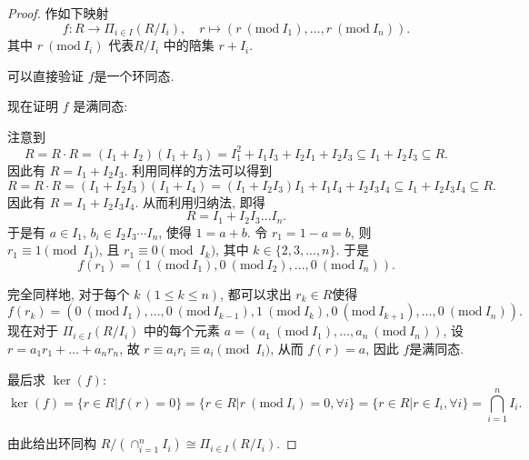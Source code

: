 \documentclass[a4paper,12pt]{ctexart}
\newtheorem{proof}{Proof}
\begin{document}
  \begin{proof} 
  作如下映射
  \[f:  R\rightarrow\Pi_{i\in I}(R/I_i),\quad r\mapsto(r~(\mathrm{mod}~I_1),\dots,r~(\mathrm{mod}~I_n)).\]
  其中 $ r~(\mathrm{mod}~I_i) $ 代表$ R/I_i $ 中的陪集 $ r+I_i $.

  可以直接验证 $ f $是一个环同态.

  现在证明 $ f $ 是满同态: 
  
  注意到 
  \[R=R\cdot R=(I_1+I_2)(I_1+I_3)=I_1^2+I_1I_3+I_2I_1+I_2I_3\subseteq I_1+I_2I_3\subseteq R.\]
  因此有 $ R=I_1+I_2I_3 $. 
  利用同样的方法可以得到
  \[R=R\cdot R=(I_1+I_2I_3)(I_1+I_4)=(I_1+I_2I_3)I_1+I_1I_4+I_2I_3I_4\subseteq I_1+I_2I_3I_4\subseteq R. \]
  因此有 $ R=I_1+I_2I_3I_4 $. 
  从而利用归纳法, 即得
  \[R=I_1+I_2I_3\dots I_n.\]
  于是有 $ a\in I_1 $, $ b_i\in I_2I_3\cdots I_n $, 使得 $ 1=a+b $. 
  令 $ r_1=1-a=b $, 则 $ r_1\equiv 1 \pmod{I_1} $, 且 $ r_1\equiv 0 \pmod{I_k} $, 其中 $ k\in\{2,3,...,n\} $. 于是
  \[f(r_1)=(1~(\mathrm{mod}~I_1),0~(\mathrm{mod}~I_2),\dots,0~(\mathrm{mod}~I_n)).\]
  
  完全同样地, 对于每个 $ k~(1\le k\le n) $, 都可以求出 $ r_k\in R $使得
  \[f(r_k)=(0~(\mathrm{mod}~I_1),\dots,0~(\mathrm{mod}~I_{k-1}),1~(\mathrm{mod}~I_k),0~(\mathrm{mod}~I_{k+1}),\dots,0~(\mathrm{mod}~I_n)).\]
  现在对于 $ \Pi_{i\in I}(R/I_i) $ 中的每个元素 $ a=(a_1~(\mathrm{mod}~I_1),\dots,a_n~(\mathrm{mod}~I_n)) $, 
  设 $ r=a_1r_1+\dots+a_nr_n $, 故 $ r\equiv a_ir_i\equiv a_i\pmod{I_i} $, 从而 $ f(r)=a $, 因此 $ f $是满同态.

  最后求 $ \ker(f) $:
  \[\ker(f)=\{r\in R|f(r)=0\}=\{r\in R|r~(\mathrm{mod}~I_i)=0,\forall i\}=\{r\in R|r\in I_i,\forall i\}=\bigcap_{i=1}^nI_i.\]
  
  由此给出环同构 $ R/(\cap_{i=1}^nI_i)\cong \Pi_{i\in I}(R/I_i) $.
  \end{proof}
  
\end{document}

